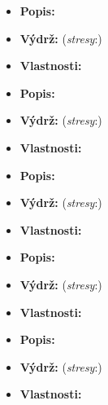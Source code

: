 \documentclass[../main.tex]{subfiles}
\begin{document}
\begin{predmet}
\begin{itemize}
	\item \textbf{Popis:} 
	\item \textbf{Výdrž:} (\emph{stresy}:) 
	\item \textbf{Vlastnosti:} 
\end{itemize}
\end{predmet}

\begin{predmet}
\begin{itemize}
	\item \textbf{Popis:} 
	\item \textbf{Výdrž:} (\emph{stresy}:) 
	\item \textbf{Vlastnosti:} 
\end{itemize}
\end{predmet}

\begin{predmet}
\begin{itemize}
	\item \textbf{Popis:} 
	\item \textbf{Výdrž:} (\emph{stresy}:) 
	\item \textbf{Vlastnosti:} 
\end{itemize}
\end{predmet}

\begin{predmet}
\begin{itemize}
	\item \textbf{Popis:} 
	\item \textbf{Výdrž:} (\emph{stresy}:) 
	\item \textbf{Vlastnosti:} 
\end{itemize}
\end{predmet}

\begin{predmet}
\begin{itemize}
	\item \textbf{Popis:} 
	\item \textbf{Výdrž:} (\emph{stresy}:) 
	\item \textbf{Vlastnosti:} 
\end{itemize}
\end{predmet}
\end{document}
